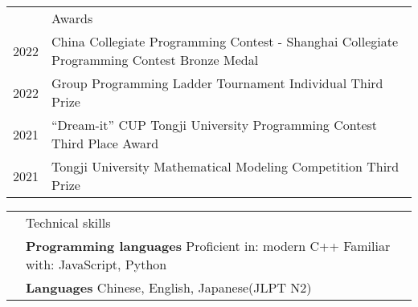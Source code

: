 \documentclass[letterpaper, 11pt]{article}
\newcommand{\headingfont}{\Large\color{OliveGreen}}
\newenvironment{SectionTable}[1]{
	\renewcommand*{\arraystretch}{1.7}
	\setlength{\tabcolsep}{10pt}
	\begin{longtable}{Rp{5.2in}} & #1 \\}
{\end{longtable}\vspace{-.3cm}}
\begin{document}

\begin{SectionTable}{\headingfont Awards}
    2022 &
    China Collegiate Programming Contest - Shanghai Collegiate Programming Contest Bronze Medal \\
    2022 &
    Group Programming Ladder Tournament Individual Third Prize \\
    2021 &
    “Dream-it” CUP Tongji University Programming Contest Third Place Award \\
    2021 &
    Tongji University Mathematical Modeling Competition Third Prize \\
\end{SectionTable}

\begin{SectionTable}{\headingfont Technical skills}
    & \textbf{Programming languages} \newline
    Proficient in: modern C++ \newline
    Familiar with: JavaScript, Python \\


    & \textbf{Languages} \newline
    Chinese, English, Japanese(JLPT N2)
\end{SectionTable}



\end{document}
